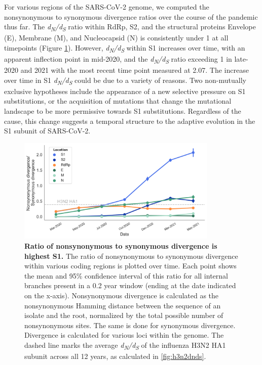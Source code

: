 \documentclass[11pt,oneside,letterpaper]{article}
\begin{document}
For various regions of the SARS-CoV-2 genome, we computed the nonsynonymous to synonymous divergence ratios over the course of the pandemic thus far.
The \emph{d\textsubscript{N}/d\textsubscript{S}} ratio within RdRp, S2, and the structural proteins Envelope (E), Membrane (M), and Nucleocapsid (N) is consistently under 1 at all timepoints (Figure \ref{fig:dnds}).
However, \emph{d\textsubscript{N}/d\textsubscript{S}} within S1 increases over time, with an apparent inflection point in mid-2020, and the \emph{d\textsubscript{N}/d\textsubscript{S}} ratio exceeding 1 in late-2020 and 2021 with the most recent time point measured at 2.07.
The increase over time in S1 \emph{d\textsubscript{N}/d\textsubscript{S}} could be due to a variety of reasons.
Two non-mutually exclusive hypotheses include the appearance of a new selective pressure on S1 substitutions, or the acquisition of mutations that change the mutational landscape to be more permissive towards S1 substitutions.
Regardless of the cause, this change suggests a temporal structure to the adaptive evolution in the S1 subunit of SARS-CoV-2.

\begin{figure}[h!]
	\centerline{\includegraphics[width=0.85\textwidth]{fig2_dnds.png}}
	\caption{\textbf{Ratio of nonsynonymous to synonymous divergence is highest S1.}
	The ratio of nonsynonymous to synonymous divergence within various coding regions is plotted over time.
	Each point shows the mean and 95\% confidence interval of this ratio for all internal branches present in a 0.2 year window (ending at the date indicated on the x-axis).
	Nonsynonymous divergence is calculated as the nonsynonymous Hamming distance between the sequence of an isolate and the root, normalized by the total possible number of nonsynonymous sites.
	The same is done for synonymous divergence.
	Divergence is calculated for various loci within the genome. 
	The dashed line marks the average \emph{d\textsubscript{N}/d\textsubscript{S}} of the influenza H3N2 HA1 subunit across all 12 years, as calculated in \ref{fig:h3n2dnds}.
	}
	\label{fig:dnds}
\end{figure}
\end{document}
